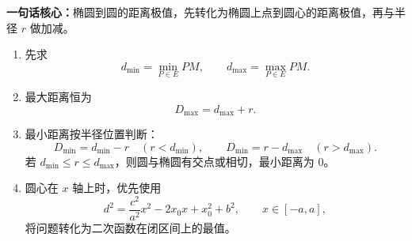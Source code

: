 \begin{summarybox}
\textbf{一句话核心：}椭圆到圆的距离极值，先转化为椭圆上点到圆心的距离极值，再与半径 $r$ 做加减。

\begin{enumerate}
    \item 先求
    \[
    d_{\min}=\min_{P\in E}PM,
    \qquad
    d_{\max}=\max_{P\in E}PM.
    \]
    \item 最大距离恒为
    \[
    D_{\max}=d_{\max}+r.
    \]
    \item 最小距离按半径位置判断：
    \[
    D_{\min}=d_{\min}-r\quad (r<d_{\min}),
    \qquad
    D_{\min}=r-d_{\max}\quad (r>d_{\max}).
    \]
    若 $d_{\min}\le r\le d_{\max}$，则圆与椭圆有交点或相切，最小距离为 $0$。
    \item 圆心在 $x$ 轴上时，优先使用
    \[
    d^2=\frac{c^2}{a^2}x^2-2x_0x+x_0^2+b^2,
    \qquad x\in[-a,a],
    \]
    将问题转化为二次函数在闭区间上的最值。
\end{enumerate}
\end{summarybox}
